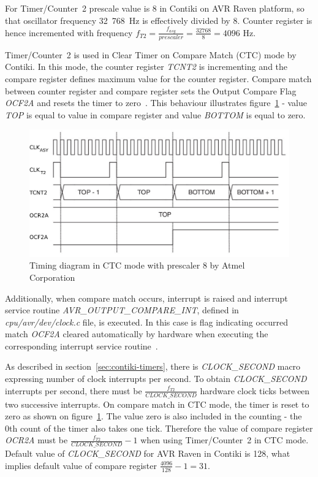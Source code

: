 For Timer/Counter~2 prescale value is 8 in Contiki on AVR Raven platform,
so that oscillator frequency 32~768~Hz is effectively divided by 8.
Counter register is hence incremented with frequency
$f_{T2} = {\frac{f_{asy}}{prescaler}} = {\frac{32768}{8}} = 4096$ Hz.

Timer/Counter~2 is used in Clear Timer on Compare Match (CTC) mode by Contiki.
In this mode, the counter register {\it{TCNT2}} is incrementing
and the compare register defines maximum value for the counter register.
Compare match between counter register and compare register
sets the Output Compare Flag {\it{OCF2A}} and resets the timer to zero~\cite{avr-datasheet}.
This behaviour illustrates figure~\ref{fig:implementation-timing-diagram}
- value {\it{TOP}} is equal to value in compare register and value {\it{BOTTOM}} is equal to zero.

\begin{figure}
  \centering
  \includegraphics[width=12cm,keepaspectratio]{fig/timing-diagram.pdf}
  \caption{Timing diagram in CTC mode with prescaler 8 by Atmel Corporation}
  \label{fig:implementation-timing-diagram}
  \bigskip
\end{figure}

Additionally, when compare match occurs,
interrupt is raised and interrupt service routine {\it{AVR\_OUTPUT\_COMPARE\_INT}},
defined in {\it{cpu/avr/dev/clock.c}} file, is executed.
In this case is flag indicating occurred match {\it{OCF2A}}
cleared automatically by hardware when executing
the corresponding interrupt service routine~\cite{avr-datasheet}.

As described in section~\ref{sec:contiki-timers}, there is
{\it{CLOCK\_SECOND}} macro expressing number of clock interrupts per second.
To obtain {\it{CLOCK\_SECOND}} interrupts per second, there must be
${\frac{f_{T2}}{CLOCK\_SECOND}}$ hardware clock ticks between two successive interrupts.
On compare match in CTC mode, the timer is reset to zero as
shown on figure~\ref{fig:implementation-timing-diagram}.
The value zero is also included in the counting - the 0th count of the timer also takes one tick.
Therefore the value of compare register {\it{OCR2A}} must be ${\frac{f_{T2}}{CLOCK\_SECOND}} - 1$
when using Timer/Counter~2 in CTC mode.
Default value of {\it{CLOCK\_SECOND}} for AVR Raven in Contiki is 128,
what implies default value of compare register ${\frac{4096}{128}} - 1 = 31$.

